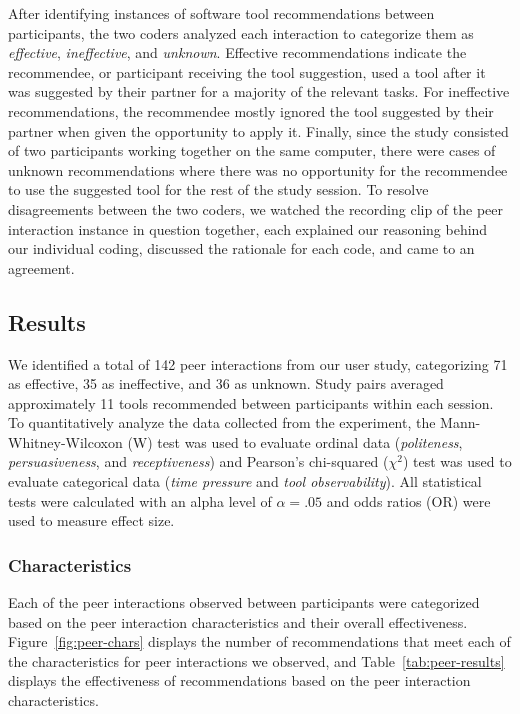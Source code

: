 After identifying instances of software tool recommendations between participants, the two coders analyzed each interaction to categorize them as \textit{effective}, \textit{ineffective}, and \textit{unknown}. Effective recommendations indicate the recommendee, or participant receiving the tool suggestion, used a tool after it was suggested by their partner for a majority of the relevant tasks. For ineffective recommendations, the recommendee mostly ignored the tool suggested by their partner when given the opportunity to apply it. Finally, since the study consisted of two participants working together on the same computer, there were cases of unknown recommendations where there was no opportunity for the recommendee to use the suggested tool for the rest of the study session. To resolve disagreements between the two coders, we watched the recording clip of the peer interaction instance in question together, each explained our reasoning behind our individual coding, discussed the rationale for each code, and came to an agreement.




\subsection{Results}

We identified a total of 142 peer interactions from our user study, categorizing 71 as effective, 35 as ineffective, and 36 as unknown. Study pairs averaged approximately 11 tools recommended between participants within each session. To quantitatively analyze the data collected from the experiment, the Mann-Whitney-Wilcoxon (W) test was used to evaluate ordinal data (\textit{politeness}, \textit{persuasiveness}, and \textit{receptiveness}) and Pearson’s chi-squared ($\chi^2$) test was used to evaluate categorical data (\textit{time pressure} and \textit{tool observability}). All statistical tests were calculated with an alpha level of $\alpha=.05$ and odds ratios (OR) were used to measure effect size.



\subsubsection{Characteristics}

Each of the peer interactions observed between participants were categorized based on the peer interaction characteristics and their overall effectiveness. Figure~\ref{fig:peer-chars} displays the number of recommendations that meet each of the characteristics for peer interactions we observed, and Table~\ref{tab:peer-results} displays the effectiveness of recommendations based on the peer interaction 
characteristics.

